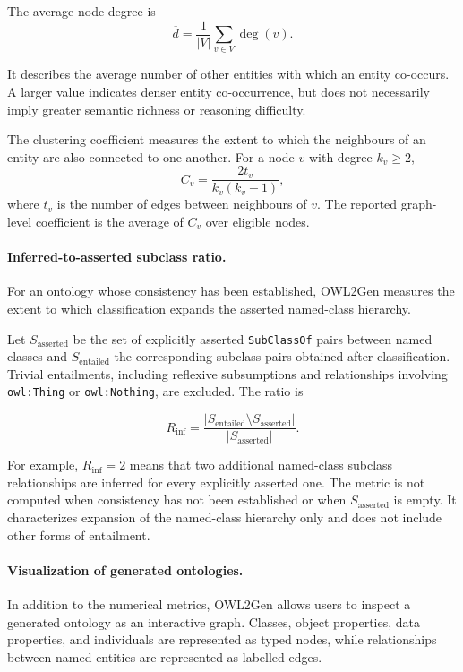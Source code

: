 The average node degree is
\[
\overline{d}
=
\frac{1}{|V|}
\sum_{v\in V}\deg(v).
\]

It describes the average number of other entities with which an entity
co-occurs. A larger value indicates denser entity co-occurrence, but does
not necessarily imply greater semantic richness or reasoning difficulty.

The clustering coefficient measures the extent to which the neighbours of
an entity are also connected to one another. For a node $v$ with degree
$k_v\geq 2$,
\[
C_v
=
\frac{2t_v}{k_v(k_v-1)},
\]
where $t_v$ is the number of edges between neighbours of $v$. The reported
graph-level coefficient is the average of $C_v$ over eligible nodes.


\paragraph{Inferred-to-asserted subclass ratio.}

For an ontology whose consistency has been established, OWL2Gen measures
the extent to which classification expands the asserted named-class
hierarchy.

Let $S_{\mathrm{asserted}}$ be the set of explicitly asserted
\texttt{SubClassOf} pairs between named classes and
$S_{\mathrm{entailed}}$ the corresponding subclass pairs obtained after
classification. Trivial entailments, including reflexive subsumptions and
relationships involving \texttt{owl:Thing} or \texttt{owl:Nothing}, are
excluded. The ratio is

\[
R_{\mathrm{inf}}
=
\frac{
\left|
S_{\mathrm{entailed}}
\setminus
S_{\mathrm{asserted}}
\right|
}{
\left|
S_{\mathrm{asserted}}
\right|
}.
\]

For example, $R_{\mathrm{inf}}=2$ means that two additional named-class
subclass relationships are inferred for every explicitly asserted one.
The metric is not computed when consistency has not been established or
when $S_{\mathrm{asserted}}$ is empty. It characterizes expansion of the
named-class hierarchy only and does not include other forms of entailment.


\paragraph{Visualization of generated ontologies.}

In addition to the numerical metrics, OWL2Gen allows users to inspect a
generated ontology as an interactive graph. Classes, object properties,
data properties, and individuals are represented as typed nodes, while
relationships between named entities are represented as labelled edges.

